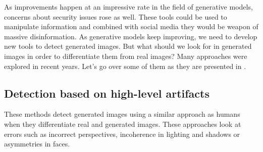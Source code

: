 \documentclass[12pt,a4paper]{article}
\begin{document}
As improvements happen at an impressive rate in the field of generative models, concerns about security issues rose as well. These tools could be used to manipulate information and combined with social media they would be weapon of massive disinformation. As generative models keep improving, we need to develop new tools to detect generated images. But what should we look for in generated images in order to differentiate them from real images? Many approaches were explored in recent years. Let's go over some of them as they are presented in \autocite*{tariangSyntheticImageVerification2024}.

\subsection{Detection based on high-level artifacts}
These methods detect generated images using a similar approach as humans when they differentiate real and generated images. These approaches look at errors such as incorrect perspectives, incoherence in lighting and shadows or asymmetries in faces.
\end{document}
